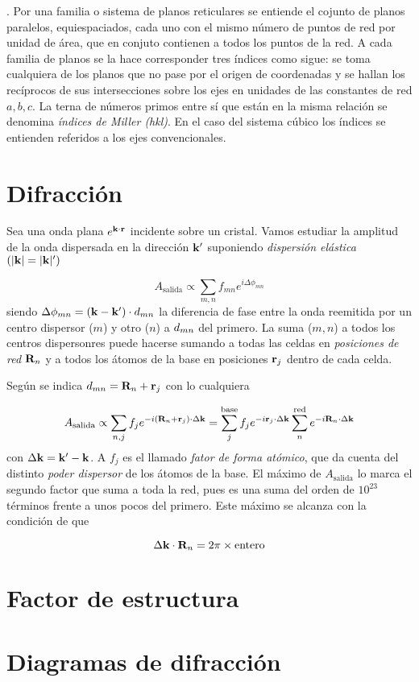 \begin{definition}. Por una familia o sistema de planos reticulares se entiende el cojunto de planos paralelos, equiespaciados, cada uno con el mismo número de puntos de red por unidad de área, que en conjuto contienen a todos los puntos de la red. A cada familia de planos se la hace corresponder tres índices como sigue: se toma cualquiera de los planos que no pase por el origen de coordenadas y se hallan los recíprocos de sus intersecciones sobre los ejes en unidades de las constantes de red $a,b,c$. La terna de números primos entre sí que están en la misma relación se denomina \textit{índices de Miller (hkl)}. En el caso del sistema cúbico los índices se entienden referidos a los ejes convencionales.    
\end{definition}

\section{Difracción}

Sea una onda plana $e^{\mathbf{k} \cdot \mathbf{r}}$ incidente sobre un cristal. Vamos estudiar la amplitud de la onda dispersada en la dirección $\mathbf{k}'$ suponiendo \textit{dispersión elástica} $(|\mathbf{k}|=|\mathbf{k}|')$

\begin{equation}
    A_{\text{salida}} \propto \sum_{m,n} f_{mn} e^{i \Delta \phi_{mn}}
\end{equation}
siendo $\Delta \phi_{mn} = (\mathbf{k} - \mathbf{k}') \cdot \mathbf{}d_{mn}$ la diferencia de fase entre la onda reemitida por un centro dispersor ($m$) y otro ($n$) a $\mathbf{}d_{mn}$ del primero. La suma ($m,n$) a todos los centros dispersonres puede hacerse sumando a todas las celdas en \textit{posiciones de red} $\mathbf{R}_n$ y a todos los átomos de la base en posiciones $\mathbf{r}_j$ dentro de cada celda. 

Según se indica $\mathbf{}d_{mn}=\mathbf{R}_n+\mathbf{r}_j$ con lo cualquiera

\begin{equation}
    A_{\text{salida}} \propto  \sum_{n,j} f_j e^{-i (\mathbf{R}_n + \mathbf{r}_j) \cdot \Delta \mathbf{k}} = \sum_j^{\text{base}} f_j e^{-i \mathbf{r}_j \cdot \Delta \mathbf{k}} \sum_{n}^{\text{red}} e^{-i\mathbf{R}_n \cdot \Delta \mathbf{k}}
\end{equation}
con $\Delta \mathbf{k} = \mathbf{k}' - \mathbf{k}$. A $f_j$ es el llamado \textit{fator de forma atómico}, que da cuenta del distinto \textit{poder dispersor} de los átomos de la base. El máximo de $A_{\text{salida}}$ lo marca el segundo factor que suma a toda la red, pues es una suma del orden de $10^{23}$ términos frente a unos pocos del primero. Este máximo se alcanza con la condición de que

\begin{equation}
    \Delta \mathbf{k} \cdot \mathbf{R}_n = 2 \pi \times \text{entero}
\end{equation}

\section{Factor de estructura}

\section{Diagramas de difracción}